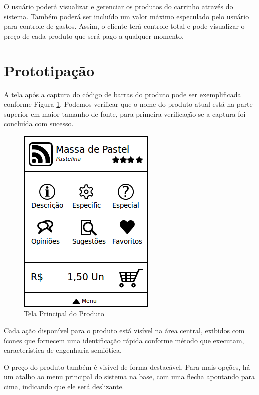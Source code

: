 \documentclass{article}
\begin{document}

O usuário poderá visualizar e gerenciar os produtos do carrinho através do
sistema. Também poderá ser incluído um valor máximo especulado pelo usuário para
controle de gastos. Assim, o cliente terá controle total e pode visualizar o
preço de cada produto que será pago a qualquer momento.

\section{Prototipação}
\label{sec:prototipacao}


A tela após a captura do código de barras do produto pode ser exemplificada
conforme Figura \ref{fig:produto}. Podemos verificar que o nome do produto atual
está na parte superior em maior tamanho de fonte, para primeira verificação se a
captura foi concluída com sucesso.

\begin{figure}[ht]
    \centering{}
    \includegraphics[scale=0.4]{images/produto.png}
    \caption{Tela Principal do Produto}
    \label{fig:produto}
\end{figure}

Cada ação disponível para o produto está visível na área central, exibidos com
ícones que fornecem uma identificação rápida conforme método que executam,
característica de engenharia semiótica.

O preço do produto também é visível de forma destacável. Para mais opções, há um
atalho ao menu principal do sistema na base, com uma flecha apontando para cima,
indicando que ele será deslizante.
\end{document}
